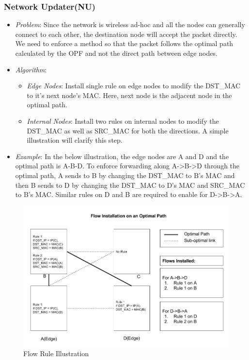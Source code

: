 \documentclass{article}
\begin{document}
\subsubsection{Network Updater(NU)}
\begin{itemize}
\item \textit{Problem}: Since the network is wireless ad-hoc and all the nodes can generally connect to each other, the
destination node will accept the packet directly. We need to enforce a method so that the packet follows the optimal
path calculated by the OPF and not the direct path between edge nodes.
\item \textit{Algorithm}: 
\begin{itemize}
\item \textit{Edge Nodes}: Install single rule on edge nodes to modify the DST\_MAC to it’s next node’s MAC. Here, next
node is the adjacent node in the optimal path.
\item \textit{Internal Nodes}: Install two rules on internal nodes to modify the DST\_MAC as well as SRC\_MAC for both the
directions. A simple illustration will clarify this step. 
\end{itemize}
\item \textit{Example}: In the below illustration, the edge nodes are A and D and the optimal path is A-B-D. To enforce
forwarding along A-\textgreater B-\textgreater D through the optimal path, A sends to B by changing the DST\_MAC to B’s MAC and then B sends to D
by changing the DST\_MAC to D’s MAC and SRC\_MAC to B’s MAC. Similar rules on D and B are required to enable for
D-\textgreater B-\textgreater A. 
\end{itemize}
\begin{figure}[H]
\caption{Flow Rule Illustration}
\centering
\includegraphics[width=\textwidth]{NU_Algorithm_Example}
\end{figure}
\end{document}
